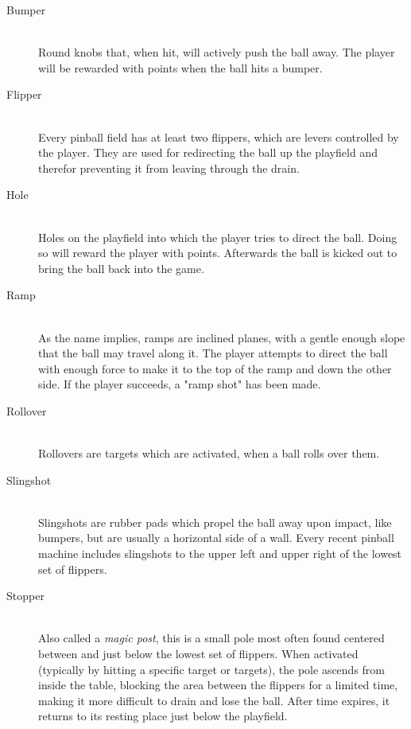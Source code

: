 \documentclass[fontsize=12pt,
               paper=a4,
               twoside=false,
               parskip=half,
               ]{scrartcl}
\begin{document}
\begin{description}

\item[Bumper] \hfill \\
Round knobs that, when hit, will actively push the ball away. %
The player will be rewarded with points when the ball hits a bumper.

\item[Flipper] \hfill \\
Every pinball field has at least two flippers, which are levers controlled by the player. They are used for redirecting the ball up the playfield and therefor preventing it from leaving through the drain.

\item[Hole] \hfill \\
Holes on the playfield into which the player tries to direct the ball. Doing so will reward the player with points. Afterwards the ball is kicked out to bring the ball back into the game.

\item[Ramp] \hfill \\
As the name implies, ramps are inclined planes, with a gentle enough slope that the ball may travel along it. The player attempts to direct the ball with enough force to make it to the top of the ramp and down the other side. If the player succeeds, a "ramp shot" has been made. %

\item[Rollover] \hfill \\
Rollovers are targets which are activated, when a ball rolls over them.

\item[Slingshot] \hfill \\
Slingshots are rubber pads which propel the ball away upon impact, like bumpers, but are usually a horizontal side of a wall. Every recent pinball machine includes slingshots to the upper left and upper right of the lowest set of flippers. %

\item[Stopper] \hfill \\
Also called a \emph{magic post}, this is a small pole most often found centered between and just below the lowest set of flippers. When activated (typically by hitting a specific target or targets), the pole ascends from inside the table, blocking the area between the flippers for a limited time, making it more difficult to drain and lose the ball. After time expires, it returns to its resting place just below the playfield. %


\end{description}
\end{document}
